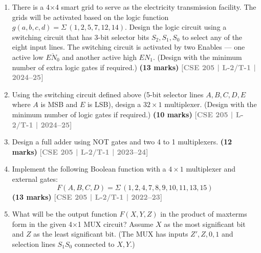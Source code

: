 \documentclass[12pt]{article}
\newcommand{\yr}[1]{\hfill\textcolor{gray}{\small\textbf{[#1]}}}
\newcommand{\mk}[1]{\textcolor{orange!70!black}{\small\textbf{(#1 marks)}}}
\begin{document}
\begin{enumerate}


\item There is a 4$\times$4 smart grid to serve as the electricity transmission facility. The grids will be activated based on the logic function $g(a,b,c,d) = \Sigma\,(1,2,5,7,12,14)$. Design the logic circuit using a switching circuit that has 3-bit selector bits $S_2, S_1, S_0$ to select any of the eight input lines. The switching circuit is activated by two Enables — one active low $\overline{EN_0}$ and another active high $EN_1$. (Design with the minimum number of extra logic gates if required.)
\mk{13} \yr{CSE 205 | L-2/T-1 | 2024--25}

\item Using the switching circuit defined above (5-bit selector lines $A, B, C, D, E$ where $A$ is MSB and $E$ is LSB), design a $32\times1$ multiplexer. (Design with the minimum number of logic gates if required.)
\mk{10} \yr{CSE 205 | L-2/T-1 | 2024--25}

\item Design a full adder using NOT gates and two 4 to 1 multiplexers.
\mk{12} \yr{CSE 205 | L-2/T-1 | 2023--24}

\item Implement the following Boolean function with a $4 \times 1$ multiplexer and external gates:
\[ F(A, B, C, D) = \Sigma\,(1, 2, 4, 7, 8, 9, 10, 11, 13, 15) \]
\mk{13} \yr{CSE 205 | L-2/T-1 | 2022--23}

\item What will be the output function $F(X, Y, Z)$ in the product of maxterms form in the given 4$\times$1 MUX circuit? Assume $X$ as the most significant bit and $Z$ as the least significant bit. (The MUX has inputs $Z', Z, 0, 1$ and selection lines $S_1S_0$ connected to $X, Y$.)

\begin{center}
\end{center}
\end{enumerate}
\end{document}
